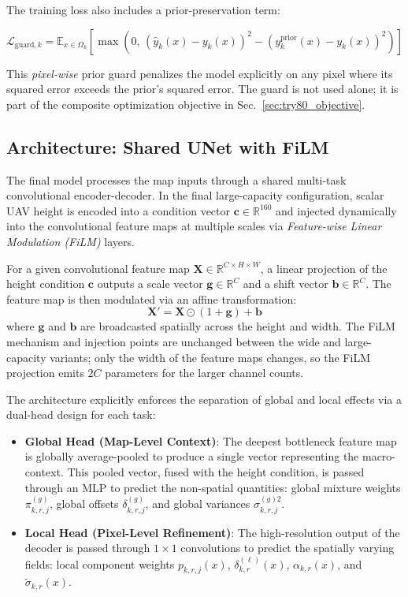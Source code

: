 The training loss also includes a prior-preservation term:

\begin{equation}
\mathcal{L}_{\mathrm{guard},k}
=
\mathbb{E}_{x\in\Omega_k}
\left[
\max\left(0,\,
\left(\hat y_k(x) - y_k(x)\right)^2
-
\left(y^{\mathrm{prior}}_k(x) - y_k(x)\right)^2
\right)
\right]
\label{eq:try80_loss}
\end{equation}

This \emph{pixel-wise} prior guard penalizes the model explicitly on any pixel
where its squared error exceeds the prior's squared error. The guard is not
used alone; it is part of the composite optimization objective in
Sec.~\ref{sec:try80_objective}.

\subsection{Architecture: Shared UNet with FiLM}

The final model processes the map inputs through a shared multi-task
convolutional encoder-decoder. In the final large-capacity configuration,
scalar UAV height is encoded into a condition vector
$\textbf{c} \in \mathbb{R}^{160}$ and injected dynamically into the
convolutional feature maps at multiple scales via
\emph{Feature-wise Linear Modulation (FiLM)} layers.

For a given convolutional feature map $\textbf{X} \in \mathbb{R}^{C \times H \times W}$, a linear projection of the height condition $\textbf{c}$ outputs a scale vector $\textbf{g} \in \mathbb{R}^C$ and a shift vector $\textbf{b} \in \mathbb{R}^C$. The feature map is then modulated via an affine transformation:
\begin{equation}
\textbf{X}' = \textbf{X} \odot (1 + \textbf{g}) + \textbf{b}
\label{eq:film}
\end{equation}
where $\textbf{g}$ and $\textbf{b}$ are broadcasted spatially across the height and width.
The FiLM mechanism and injection points are unchanged between the wide and
large-capacity variants; only the width of the feature maps changes, so the
FiLM projection emits \(2C\) parameters for the larger channel counts.

The architecture explicitly enforces the separation of global and local effects via a dual-head design for each task:

\begin{itemize}
\item \textbf{Global Head (Map-Level Context)}: The deepest bottleneck feature map is globally average-pooled to produce a single vector representing the macro-context. This pooled vector, fused with the height condition, is passed through an MLP to predict the non-spatial quantities: global mixture weights $\pi^{(g)}_{k,r,j}$, global offsets $\delta^{(g)}_{k,r,j}$, and global variances $\sigma^{(g)2}_{k,r,j}$.
\item \textbf{Local Head (Pixel-Level Refinement)}: The high-resolution output of the decoder is passed through $1\times1$ convolutions to predict the spatially varying fields: local component weights $p_{k,r,j}(x)$, $\delta^{(\ell)}_{k,r}(x)$, $\alpha_{k,r}(x)$, and $\tilde\sigma_{k,r}(x)$.
\end{itemize}

